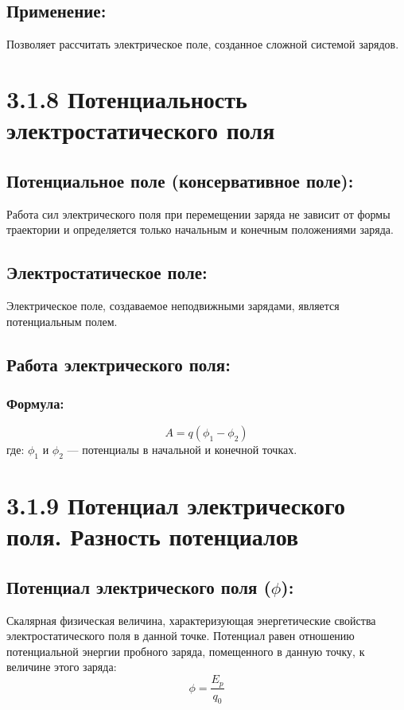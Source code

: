 \documentclass[a4paper,12pt]{article}
\begin{document}
\vspace{-9pt}
\subsection*{Применение:}
\vspace{-3pt}
Позволяет рассчитать электрическое поле, созданное сложной системой зарядов.

\section*{3.1.8 Потенциальность электростатического поля}
\vspace{-9pt}
\subsection*{Потенциальное поле (консервативное поле):}
\vspace{-3pt}
Работа сил электрического поля при перемещении заряда не зависит от формы траектории и определяется только начальным и конечным положениями заряда.

\vspace{-9pt}
\subsection*{Электростатическое поле:}
\vspace{-3pt}
Электрическое поле, создаваемое неподвижными зарядами, является потенциальным полем.

\vspace{-9pt}
\subsection*{Работа электрического поля:}
\vspace{-3pt}
\subsubsection*{Формула:}
\vspace{-0.05em}
$$ A = q(\phi_1 - \phi_2) $$
где: $\phi_1$ и $\phi_2$ — потенциалы в начальной и конечной точках.

\newpage
\section*{3.1.9 Потенциал электрического поля. Разность потенциалов}
\vspace{-9pt}
\subsection*{Потенциал электрического поля ($\phi$):}
\vspace{-3pt}
Скалярная физическая величина, характеризующая энергетические свойства электростатического поля в данной точке. Потенциал равен отношению потенциальной энергии пробного заряда, помещенного в данную точку, к величине этого заряда:
\vspace{-0.05em}
$$ \phi = \frac{E_p}{q_0} $$
\end{document}
